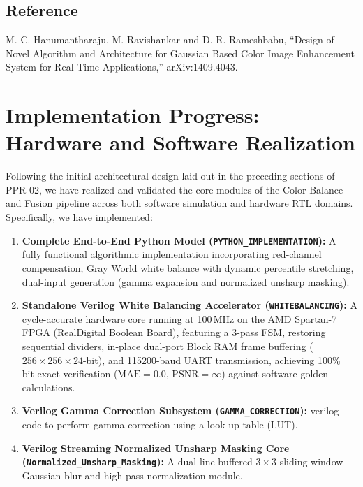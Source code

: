 \documentclass[10pt,twocolumn,letterpaper]{article}
\begin{document}
\subsection{Reference}
M. C. Hanumantharaju, M. Ravishankar and D. R. Rameshbabu,
``Design of Novel Algorithm and Architecture for Gaussian Based Color Image Enhancement System for Real Time Applications,'' arXiv:1409.4043.



\section{Implementation Progress: Hardware and Software Realization}
\label{sec:progress_implementation}

Following the initial architectural design laid out in the preceding sections of PPR-02, we have realized and validated the core modules of the Color Balance and Fusion pipeline across both software simulation and hardware RTL domains. Specifically, we have implemented:
\begin{enumerate}
    \item \textbf{Complete End-to-End Python Model (\texttt{PYTHON\_IMPLEMENTATION}):} A fully functional algorithmic implementation incorporating red-channel compensation, Gray World white balance with dynamic percentile stretching, dual-input generation (gamma expansion and normalized unsharp masking).
    \item \textbf{Standalone Verilog White Balancing Accelerator (\texttt{WHITEBALANCING}):} A cycle-accurate hardware core running at 100\,MHz on the AMD Spartan-7 FPGA (RealDigital Boolean Board), featuring a 3-pass FSM, restoring sequential dividers, in-place dual-port Block RAM frame buffering ($256\times256\times24$-bit), and 115200-baud UART transmission, achieving 100\% bit-exact verification ($\text{MAE}=0.0$, $\text{PSNR}=\infty$) against software golden calculations.
    \item \textbf{Verilog Gamma Correction Subsystem (\texttt{GAMMA\_CORRECTION}):} verilog code to perform gamma correction using a look-up table (LUT).
    \item \textbf{Verilog Streaming Normalized Unsharp Masking Core (\texttt{Normalized\_Unsharp\_Masking}):} A dual line-buffered $3\times3$ sliding-window Gaussian blur and high-pass normalization module.
\end{enumerate}
\end{document}
